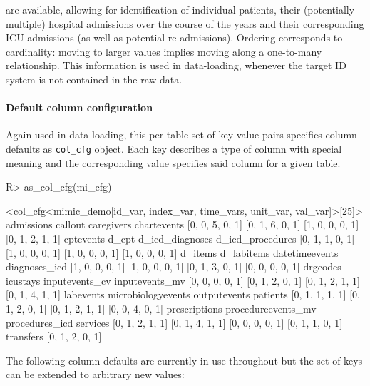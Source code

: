 \documentclass[
]{jss}
\begin{document}
are available, allowing for identification of individual patients, their
(potentially multiple) hospital admissions over the course of the years
and their corresponding ICU admissions (as well as potential
re-admissions). Ordering corresponds to cardinality: moving to larger
values implies moving along a one-to-many relationship. This information
is used in data-loading, whenever the target ID system is not contained
in the raw data.

\hypertarget{default-column-configuration}{%
\paragraph{Default column
configuration}\label{default-column-configuration}}

Again used in data loading, this per-table set of key-value pairs
specifies column defaults as \texttt{col\_cfg} object. Each key
describes a type of column with special meaning and the corresponding
value specifies said column for a given table.

\begin{CodeChunk}
\begin{CodeInput}
R> as_col_cfg(mi_cfg)
\end{CodeInput}
\begin{CodeOutput}
<col_cfg<mimic_demo[id_var, index_var, time_vars, unit_var, val_var]>[25]>
        admissions            callout         caregivers        chartevents 
   [0, 0, 5, 0, 1]    [0, 1, 6, 0, 1]    [1, 0, 0, 0, 1]    [0, 1, 2, 1, 1] 
         cptevents              d_cpt    d_icd_diagnoses   d_icd_procedures 
   [0, 1, 1, 0, 1]    [1, 0, 0, 0, 1]    [1, 0, 0, 0, 1]    [1, 0, 0, 0, 1] 
           d_items         d_labitems     datetimeevents      diagnoses_icd 
   [1, 0, 0, 0, 1]    [1, 0, 0, 0, 1]    [0, 1, 3, 0, 1]    [0, 0, 0, 0, 1] 
          drgcodes           icustays     inputevents_cv     inputevents_mv 
   [0, 0, 0, 0, 1]    [0, 1, 2, 0, 1]    [0, 1, 2, 1, 1]    [0, 1, 4, 1, 1] 
         labevents microbiologyevents       outputevents           patients 
   [0, 1, 1, 1, 1]    [0, 1, 2, 0, 1]    [0, 1, 2, 1, 1]    [0, 0, 4, 0, 1] 
     prescriptions procedureevents_mv     procedures_icd           services 
   [0, 1, 2, 1, 1]    [0, 1, 4, 1, 1]    [0, 0, 0, 0, 1]    [0, 1, 1, 0, 1] 
         transfers 
   [0, 1, 2, 0, 1] 
\end{CodeOutput}
\end{CodeChunk}

The following column defaults are currently in use throughout 
but the set of keys can be extended to arbitrary new values:
\end{document}
